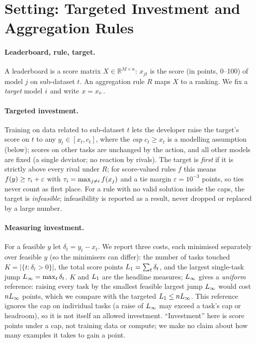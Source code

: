 \section{Setting: Targeted Investment and Aggregation Rules}
\label{sec:method}

\paragraph{Leaderboard, rule, target.}
A leaderboard is a score matrix $X\in\mathbb{R}^{M\times n}$: $x_{jt}$ is the score (in points, 0--100) of model $j$ on sub-dataset $t$. An aggregation rule $R$ maps $X$ to a ranking. We fix a \emph{target} model $i$ and write $x=x_{i\cdot}$.

\paragraph{Targeted investment.}
Training on data related to sub-dataset $t$ lets the developer raise the target's score on $t$ to any $y_t\in[x_t,c_t]$, where the \emph{cap} $c_t\ge x_t$ is a modelling assumption (below); scores on other tasks are unchanged by the action, and all other models are fixed (a single deviator; no reaction by rivals). The target is \emph{first} if it is strictly above every rival under $R$; for score-valued rules $f$ this means $f(y)\ge \tau_i+\varepsilon$ with $\tau_i=\max_{j\ne i}f(x_j)$ and a tie margin $\varepsilon=10^{-3}$ points, so ties never count as first place. For a rule with no valid solution inside the caps, the target is \emph{infeasible}; infeasibility is reported as a result, never dropped or replaced by a large number.

\paragraph{Measuring investment.}
For a feasible $y$ let $\delta_t=y_t-x_t$. We report three costs, each minimised separately over feasible $y$ (so the minimisers can differ): the number of tasks touched $K=|\{t:\delta_t>0\}|$, the total score points $L_1=\sum_t\delta_t$, and the largest single-task jump $L_\infty=\max_t\delta_t$. $K$ and $L_1$ are the headline measures; $L_\infty$ gives a \emph{uniform} reference: raising every task by the smallest feasible largest jump $L_\infty$ would cost $nL_\infty$ points, which we compare with the targeted $L_1\le nL_\infty$. This reference ignores the cap on individual tasks (a raise of $L_\infty$ may exceed a task's cap or headroom), so it is not itself an allowed investment. ``Investment'' here is score points under a cap, not training data or compute; we make no claim about how many examples it takes to gain a point.

